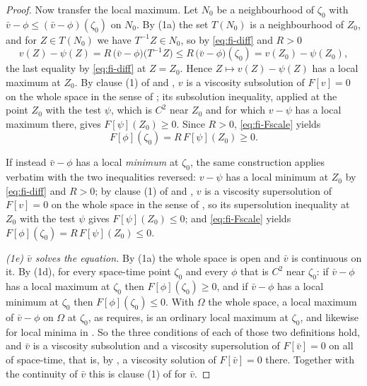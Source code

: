 \begin{proof}
Now transfer the local maximum. Let $N_0$ be a neighbourhood of $\zeta_0$ with
$\bar v-\phi\le(\bar v-\phi)(\zeta_0)$ on $N_0$. By (1a) the set $T(N_0)$ is a
neighbourhood of $Z_0$, and for $Z\in T(N_0)$ we have $T^{-1}Z\in N_0$, so by
\eqref{eq:fi-diff} and $R>0$
\[
  v(Z)-\psi(Z)=R\,\bigl(\bar v-\phi\bigr)\bigl(T^{-1}Z\bigr)
   \le R\,\bigl(\bar v-\phi\bigr)(\zeta_0)=v(Z_0)-\psi(Z_0),
\]
the last equality by \eqref{eq:fi-diff} at $Z=Z_0$. Hence
$Z\mapsto v(Z)-\psi(Z)$ has a local maximum at $Z_0$. By clause (1) of
 and , $v$ is a viscosity
subsolution of $F[v]=0$ on the whole space in the sense of
; its subsolution inequality, applied at the point $Z_0$
with the test $\psi$, which is $C^2$ near $Z_0$ and for which $v-\psi$ has a
local maximum there, gives $F[\psi](Z_0)\ge0$. Since $R>0$,
\eqref{eq:fi-Fscale} yields
\[
  F[\phi](\zeta_0)=R\,F[\psi](Z_0)\ge0 .
\]

If instead $\bar v-\phi$ has a local \emph{minimum} at $\zeta_0$, the same
construction applies verbatim with the two inequalities reversed: $v-\psi$ has a
local minimum at $Z_0$ by \eqref{eq:fi-diff} and $R>0$; by clause (1) of
 and , $v$ is a viscosity
supersolution of $F[v]=0$ on the whole space in the sense of
, so its supersolution inequality at $Z_0$ with the test
$\psi$ gives $F[\psi](Z_0)\le0$; and \eqref{eq:fi-Fscale} yields
$F[\phi](\zeta_0)=R\,F[\psi](Z_0)\le0$.

\emph{(1e) $\bar v$ solves the equation.}
By (1a) the whole space is open and $\bar v$ is continuous on it. By (1d), for
every space-time point $\zeta_0$ and every $\phi$ that is $C^2$ near $\zeta_0$:
if $\bar v-\phi$ has a local maximum at $\zeta_0$ then $F[\phi](\zeta_0)\ge0$,
and if $\bar v-\phi$ has a local minimum at $\zeta_0$ then
$F[\phi](\zeta_0)\le0$. With $\Omega$ the whole space, a local maximum of
$\bar v-\phi$ on $\Omega$ at $\zeta_0$, as  requires, is
an ordinary local maximum at $\zeta_0$, and likewise for local minima in
. So the three conditions of each of those two
definitions hold, and $\bar v$ is a viscosity subsolution and a viscosity
supersolution of
$F[\bar v]=0$ on all of space-time, that is, by , a
viscosity solution of $F[\bar v]=0$ there. Together with the continuity of
$\bar v$ this is clause (1) of  for $\bar v$.


\end{proof}
